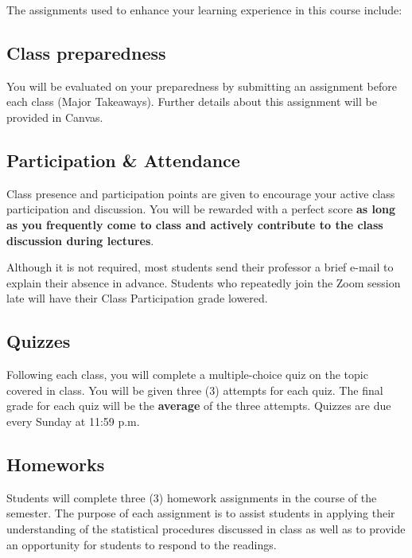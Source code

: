 \documentclass[11pt,]{article}
\begin{document}
The assignments used to enhance your learning experience in this course
include:

\hypertarget{class-preparedness}{%
\subsection{Class preparedness}\label{class-preparedness}}

You will be evaluated on your preparedness by submitting an assignment
before each class (Major Takeaways). Further details about this
assignment will be provided in Canvas.

\hypertarget{participation-attendance}{%
\subsection{Participation \&
Attendance}\label{participation-attendance}}

Class presence and participation points are given to encourage your
active class participation and discussion. You will be rewarded with a
perfect score \textbf{as long as you frequently come to class and
actively contribute to the class discussion during lectures}.

Although it is not required, most students send their professor a brief
e-mail to explain their absence in advance. Students who repeatedly join
the Zoom session late will have their Class Participation grade lowered.

\hypertarget{quizzes}{%
\subsection{Quizzes}\label{quizzes}}

Following each class, you will complete a multiple-choice quiz on the
topic covered in class. You will be given three (3) attempts for each
quiz. The final grade for each quiz will be the \textbf{average} of the
three attempts. Quizzes are due every Sunday at 11:59 p.m.

\hypertarget{homeworks}{%
\subsection{Homeworks}\label{homeworks}}

Students will complete three (3) homework assignments in the course of
the semester. The purpose of each assignment is to assist students in
applying their understanding of the statistical procedures discussed in
class as well as to provide an opportunity for students to respond to
the readings.
\end{document}
